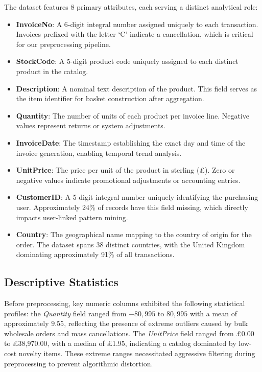 \documentclass[conference]{IEEEtran}
\begin{document}
The dataset features 8 primary attributes, each serving a distinct analytical role:
\begin{itemize}
    \item \textbf{InvoiceNo}: A 6-digit integral number assigned uniquely to each transaction. Invoices prefixed with the letter `C' indicate a cancellation, which is critical for our preprocessing pipeline.
    \item \textbf{StockCode}: A 5-digit product code uniquely assigned to each distinct product in the catalog.
    \item \textbf{Description}: A nominal text description of the product. This field serves as the item identifier for basket construction after aggregation.
    \item \textbf{Quantity}: The number of units of each product per invoice line. Negative values represent returns or system adjustments.
    \item \textbf{InvoiceDate}: The timestamp establishing the exact day and time of the invoice generation, enabling temporal trend analysis.
    \item \textbf{UnitPrice}: The price per unit of the product in sterling (\pounds). Zero or negative values indicate promotional adjustments or accounting entries.
    \item \textbf{CustomerID}: A 5-digit integral number uniquely identifying the purchasing user. Approximately 24\% of records have this field missing, which directly impacts user-linked pattern mining.
    \item \textbf{Country}: The geographical name mapping to the country of origin for the order. The dataset spans 38 distinct countries, with the United Kingdom dominating approximately 91\% of all transactions.
\end{itemize}

\subsection{Descriptive Statistics}
Before preprocessing, key numeric columns exhibited the following statistical profiles: the \textit{Quantity} field ranged from $-80,995$ to $80,995$ with a mean of approximately $9.55$, reflecting the presence of extreme outliers caused by bulk wholesale orders and mass cancellations. The \textit{UnitPrice} field ranged from \pounds0.00 to \pounds38,970.00, with a median of \pounds1.95, indicating a catalog dominated by low-cost novelty items. These extreme ranges necessitated aggressive filtering during preprocessing to prevent algorithmic distortion.
\end{document}
